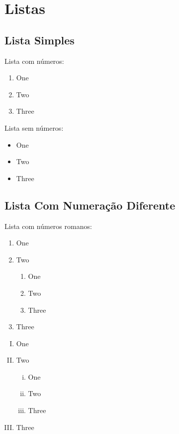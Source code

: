 
\chapter{Listas}
\section{Lista Simples}

Lista com números:

\begin{enumerate}
  \item One
  \item Two
  \item Three
\end{enumerate}

Lista sem números:

\begin{itemize}
  \item One
  \item Two
  \item Three
\end{itemize}

\section{Lista Com Numeração Diferente}

Lista com números romanos:

\begin{enumerate}[I]
  \item One
  \item Two
        \begin{enumerate}[i]
          \item One
          \item Two
          \item Three
        \end{enumerate}
  \item Three
\end{enumerate}

\begin{enumerate}[(I)]
  \item One
  \item Two
        \begin{enumerate}[(i)]
          \item One
          \item Two
          \item Three
        \end{enumerate}
  \item Three
\end{enumerate}%

